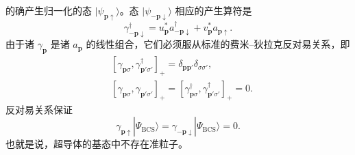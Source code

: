 的确产生归一化的态 $|\psi_{\mathbf{p}\uparrow}\rangle$。态 $|\psi_{-\mathbf{p}\downarrow}\rangle$ 相应的产生算符是
\begin{equation*}
\gamma_{-\mathbf{p}\downarrow}^{\dagger}=u_{\mathbf{p}}^{*}a_{-\mathbf{p}\downarrow}^{\dagger}+v_{\mathbf{p}}^{*}a_{\mathbf{p}\uparrow}.\tag{12.222}
\end{equation*}
由于诸 $\gamma_{\mathbf{p}}$ 是诸 $a_{\mathbf{p}}$ 的线性组合，它们必须服从标准的费米–狄拉克反对易关系，即
\begin{align*}
&\left[\gamma_{\mathbf{p}\sigma},\gamma_{\mathbf{p}'\sigma'}^{\dagger}\right]_{+}=\delta_{\mathbf{p}\mathbf{p}'}\delta_{\sigma\sigma'},\\
&\left[\gamma_{\mathbf{p}\sigma},\gamma_{\mathbf{p}'\sigma'}\right]_{+}=\left[\gamma_{\mathbf{p}\sigma}^{\dagger},\gamma_{\mathbf{p}'\sigma'}^{\dagger}\right]_{+}=0.\tag{12.223}
\end{align*}
反对易关系保证
\begin{equation*}
\gamma_{\mathbf{p}\uparrow}|\Psi_{\mathrm{BCS}}\rangle=\gamma_{-\mathbf{p}\downarrow}|\Psi_{\mathrm{BCS}}\rangle=0.\tag{12.224}
\end{equation*}
也就是说，超导体的基态中不存在准粒子。

